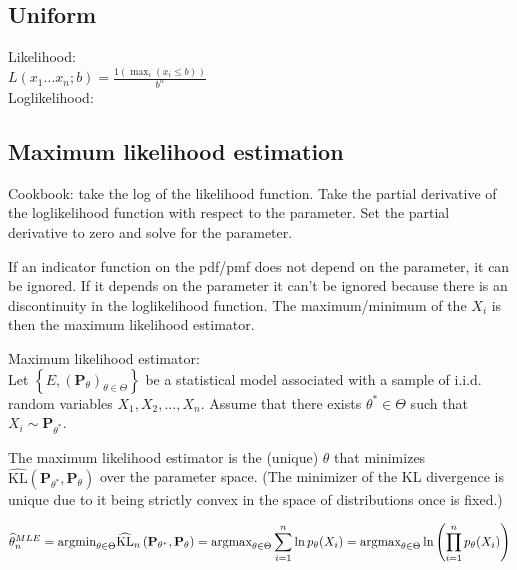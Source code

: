 \subsection*{Uniform}

Likelihood:\\
$L(x_1\dots x_n;b)=\frac{1(\max_i (x_i \leq b))} {b^n}$\\

Loglikelihood:\\

\subsection*{Maximum likelihood estimation}

Cookbook: take the log of the likelihood function. Take the partial derivative of the loglikelihood function with respect to the parameter. Set the partial derivative to zero and solve for the parameter.

If an indicator function on the pdf/pmf does not depend on the parameter, it can be ignored. If it depends on the parameter it can't be ignored because there is an discontinuity in the loglikelihood function. The maximum/minimum of the $X_i$ is then the maximum likelihood estimator.

Maximum likelihood estimator:\\

Let $\left\{ E,\left(\mathbf{P}_{\theta }\right)_{\theta \in \Theta }\right\}$  be a statistical model associated with a sample of i.i.d. random variables $X_1, X_2, \dots , X_ n$. Assume that there exists $\theta ^* \in \Theta$ such that $X_ i \sim \mathbf{P}_{\theta ^*}$.

The maximum likelihood estimator is the (unique) $\theta$ that minimizes $\widehat{\text {KL}}\left(\mathbf{P}_{\theta ^*}, \mathbf{P}_{\theta }\right)$ over the parameter space. (The minimizer of the KL divergence is unique due to it being strictly convex in the space of distributions once  is fixed.)

$\widehat{\theta }_ n^{MLE} =\\ \displaystyle \text {argmin}_{\theta \in \Theta }\widehat{\text {KL}}_ n\left(\mathbf{P}_{\theta ^*}, \mathbf{P}_{\theta }\right) =\\ \displaystyle \text {argmax}_{\theta \in \Theta } \sum _{i=1}^{n} \ln p_{\theta }(X_ i) =\\  \displaystyle \text {argmax}_{\theta \in \Theta } \ln \left(\prod _{i=1}^{n} p_{\theta }(X_ i)\right)$

